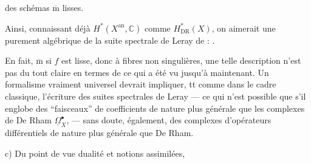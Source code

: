 des schémas $\overline{\mathrm m}$ lisses. 

Ainsi, connaissant déjà $H^*(X^{\mathrm{an}},\mathbb C)$ comme $H_{\mathrm{DR}}^*(X)$, on aimerait une  purement algébrique de la suite spectrale de Leray de
 :
.

En fait, $\overline{\mathrm m}$ si $f$ est lisse, donc à fibres non singulières, une telle description n'est pas du tout claire en termes de ce qui a été vu jusqu'à maintenant.
\deleted{[les $\mathbb R^q f_*(\underline\Omega_{X/\mathbb C}^\bullet)$}
Un formalisme
 vraiment universel devrait impliquer, tt comme dans le cadre classique, l'écriture des suites spectrales de Leray — ce qui n'est possible que s'il englobe des ``faisceaux'' de coefficients de nature plus générale que les complexes de De Rham $\underline\Omega_X^\bullet$, —  sans doute, également, des complexes d'opérateurs différentiels de nature plus générale que De Rham.

c) Du point de vue dualité et notions assimilées,
